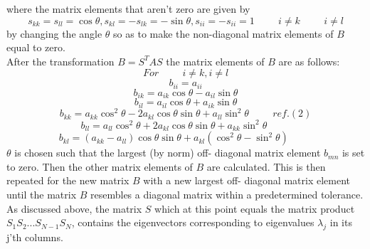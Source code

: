 \documentclass[10pt,a4paper]{article}
\begin{document}
where the matrix elements that aren't zero are given by
$$
s_{kk}=s_{ll}=\cos\theta,s_{kl}=-s_{lk}=-\sin\theta,s_{ii}=-s_{ii}=1\hspace{1cm} i\neq k\hspace{1cm} i\neq l
$$
by changing the angle $\theta$ so as to make the non-diagonal matrix elements of $B$ equal to zero.\\After the transformation $B=S^TAS$ the matrix elements of $B$ are as follows:
$$
For \hspace{1cm} i\neq k,i \neq l
$$
$$
b_{ii} = a_{ii}
$$
$$
b_{ik} = a_{ik}\cos\theta - a_{il}\sin\theta
$$
$$
b_{il} = a_{il}\cos\theta + a_{ik}\sin\theta
$$
$$
b_{kk} = a_{kk}\cos^2\theta - 2a_{kl}\cos\theta \sin\theta + a_{ll}\sin^2\theta \hspace{1cm} ref. (2)
$$
$$
b_{ll} = a_{ll}\cos^2\theta + 2a_{kl}\cos\theta \sin\theta + a_{kk}\sin^2\theta \hspace{1cm}
$$
$$
b_{kl} = (a_{kk}-a_{ll})\cos\theta \sin\theta + a_{kl}(\cos^2\theta-\sin^2\theta) \hspace{1cm}
$$
$\theta$ is chosen such that the largest (by norm) off- diagonal matrix element $b_{mn}$ is set to zero. Then the other matrix elements of $B$ are calculated. This is then repeated for the new matrix $B$ with a new largest off- diagonal matrix element until the matrix $B$ resembles a diagonal matrix within a predetermined tolerance. As discussed above, the matrix $S$ which at this point equals the matrix product $S_1S_2...S_{N-1}S_N$, contains the eigenvectors corresponding to eigenvalues $\lambda_j$ in its j'th columns.
\end{document}
